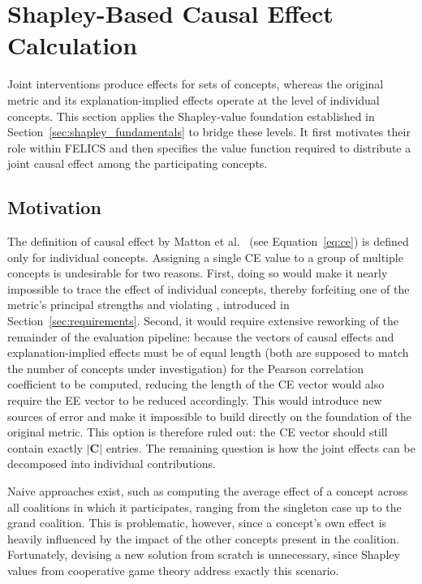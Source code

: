 \section{Shapley-Based Causal Effect Calculation}
\label{sec:shapley}
Joint interventions produce effects for sets of concepts, whereas the original metric and its explanation-implied effects operate at the level of individual concepts. This section applies the Shapley-value foundation established in Section~\ref{sec:shapley_fundamentals} to bridge these levels. It first motivates their role within FELICS and then specifies the value function required to distribute a joint causal effect among the participating concepts.

\subsection{Motivation}
\label{sec:shapley_motivation}

The definition of causal effect by Matton et al.~\cite{mattonWalkTalkMeasuring2024} (see Equation~\ref{eq:ce}) is defined only for individual concepts. Assigning a single CE value to a group of multiple concepts is undesirable for two reasons. First, doing so would make it nearly impossible to trace the effect of individual concepts, thereby forfeiting one of the metric's principal strengths and violating , introduced in Section~\ref{sec:requirements}. Second, it would require extensive reworking of the remainder of the evaluation pipeline: because the vectors of causal effects and explanation-implied effects must be of equal length (both are supposed to match the number of concepts under investigation) for the Pearson correlation coefficient to be computed, reducing the length of the CE vector would also require the EE vector to be reduced accordingly. This would introduce new sources of error and make it impossible to build directly on the foundation of the original metric. This option is therefore ruled out: the CE vector should still contain exactly $|\mathbf{C}|$ entries. The remaining question is how the joint effects can be decomposed into individual contributions.

Naive approaches exist, such as computing the average effect of a concept across all coalitions in which it participates, ranging from the singleton case up to the grand coalition. This is problematic, however, since a concept's own effect is heavily influenced by the impact of the other concepts present in the coalition. Fortunately, devising a new solution from scratch is unnecessary, since Shapley values from cooperative game theory address exactly this scenario.

